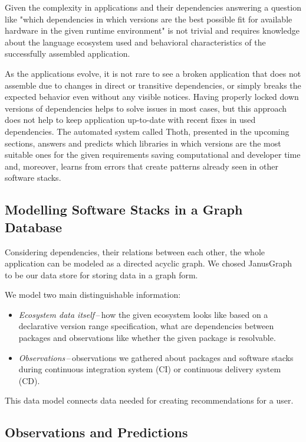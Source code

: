 \documentclass[a4paper]{llncs}
\begin{document}
Given the complexity in applications and their dependencies answering a question like "which dependencies in which versions are the best possible fit for available hardware in the given runtime environment" is not trivial and requires knowledge about the language ecosystem used and behavioral characteristics of the successfully assembled application.

As the applications evolve, it is not rare to see a broken application that does not assemble due to changes in direct or transitive dependencies, or simply breaks the expected behavior even without any visible notices. Having properly locked down versions of dependencies helps to solve issues in most cases, but this approach does not help to keep application up-to-date with recent fixes in used dependencies. The automated system called Thoth, presented in the upcoming sections, answers and predicts which libraries in which versions are the most suitable ones for the given requirements saving computational and developer time and, moreover, learns from errors that create patterns already seen in other software stacks.

\subsection{Modelling Software Stacks in a Graph Database} \label{section_modelling_software_stacks}

Considering dependencies, their relations between each other, the whole application can be modeled as a directed acyclic graph. We chosed JanusGraph~\cite{ref_janusgraph} to be our data store for storing data in a graph form.

We model two main distinguishable information:

\begin{itemize}
  \item \emph{Ecosystem data itself}\,--\,how the given ecosystem looks like based on a declarative version range specification, what are dependencies between packages and observations like whether the given package is resolvable.
  \item \emph{Observations}\,--\,observations we gathered about packages and software stacks during continuous integration system (CI) or continuous delivery system (CD).
\end{itemize}

This data model connects data needed for creating recommendations for a user.

\subsection{Observations and Predictions}
\end{document}
